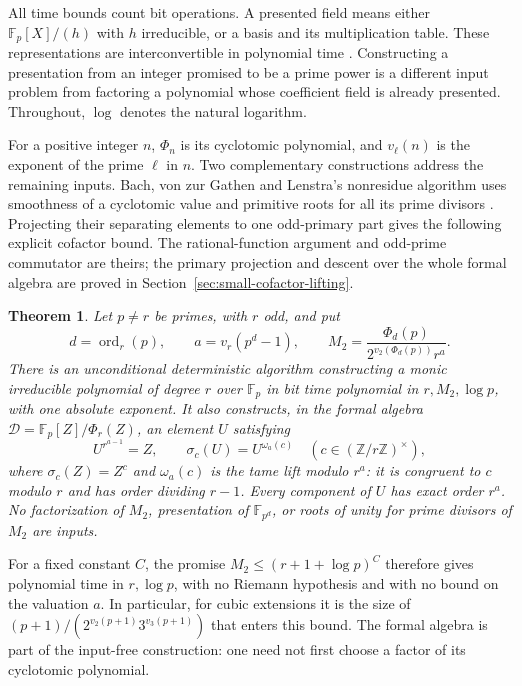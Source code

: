 \documentclass[11pt]{article}
\newcommand{\F}{\mathbb F}
\newtheorem{theorem}{Theorem}[section]
\theoremstyle{definition}
\theoremstyle{remark}
\begin{document}
All time bounds count bit operations.  A presented field means either
$\F_p[X]/(h)$ with $h$ irreducible, or a basis and its multiplication
table.  These representations are interconvertible in polynomial time
\citep[Theorem~(1.1), pp.~329--330]{Lenstra1991}.
Constructing a presentation from an integer promised to be a prime power
is a different input problem from factoring a polynomial whose coefficient
field is already presented.  Throughout, $\log$ denotes the natural logarithm.


For a positive integer \(n\), \(\Phi_n\) is its cyclotomic polynomial,
and \(v_\ell(n)\) is the exponent of the prime \(\ell\) in \(n\).
Two complementary constructions address the remaining inputs.
Bach, von zur Gathen and Lenstra's nonresidue algorithm uses
smoothness of a cyclotomic value and primitive roots for all its
prime divisors \citep[Theorem~3, author p.~3; Section~5,
pp.~17--20]{BGL2001}. Projecting their separating elements to
one odd-primary part gives the following explicit cofactor bound.
The rational-function argument and odd-prime commutator are theirs;
the primary projection and descent over the whole formal algebra
are proved in Section~\ref{sec:small-cofactor-lifting}.

\begin{theorem}\label{cor:two-primary-cyclotomic-cofactor}
Let \(p\ne r\) be primes, with \(r\) odd, and put
\[
 d=\operatorname{ord}_r(p),\qquad
 a=v_r(p^d-1),\qquad
 M_2=\frac{\Phi_d(p)}{2^{v_2(\Phi_d(p))}r^a}.
\]
There is an unconditional deterministic algorithm constructing
a monic irreducible polynomial of degree \(r\) over
\(\mathbb F_p\) in bit time polynomial in \(r,M_2,\log p\),
with one absolute exponent. It also constructs, in the formal
algebra \(\mathcal D=\mathbb F_p[Z]/\Phi_r(Z)\), an element
\(U\) satisfying
\[
 U^{r^{a-1}}=Z,\qquad
 \sigma_c(U)=U^{\omega_a(c)}
           \quad(c\in(\mathbb Z/r\mathbb Z)^\times),
\]
where \(\sigma_c(Z)=Z^c\) and \(\omega_a(c)\) is the tame
lift modulo \(r^a\): it is congruent to \(c\) modulo \(r\)
and has order dividing \(r-1\). Every component of \(U\) has exact
order \(r^a\). No factorization of \(M_2\), presentation of
\(\mathbb F_{p^d}\), or roots of unity for prime divisors of
\(M_2\) are inputs.
\end{theorem}

For a fixed constant \(C\), the promise
\(M_2\leq(r+1+\log p)^C\) therefore gives polynomial time
in \(r,\log p\), with no Riemann hypothesis and with no bound
on the valuation \(a\). In particular, for cubic extensions it
is the size of \((p+1)/(2^{v_2(p+1)}3^{v_3(p+1)})\) that enters this bound.
The formal algebra is part of the input-free construction: one need
not first choose a factor of its cyclotomic polynomial.
\end{document}
